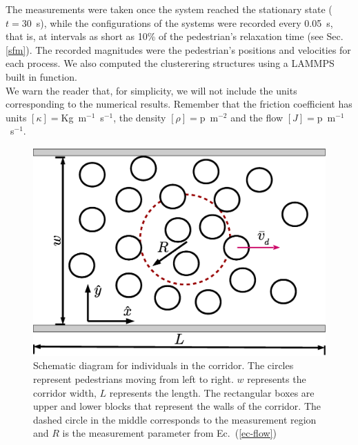The measurements were taken once the system reached the stationary state ($t=30$~s), while the configurations of the systems were recorded every 0.05~s, that is, at intervals as short as 10\% of the pedestrian’s relaxation time (see Sec. \ref{sfm}). The recorded magnitudes were the pedestrian’s positions and velocities for each process. We also computed the clusterering structures using a LAMMPS built in function.\\
  
We warn the reader that, for simplicity, we will not include the units corresponding to the numerical results. Remember that the friction coefficient has units $\left [ \kappa \right]=$Kg~m$^{-1}$~s$^{-1}$, the density $\left [ \rho \right]=$p~m$^{-2}$  and the flow  $\left [ J \right ]=$p~m$^{-1}$~s$^{-1}$.


\begin{figure}[htbp!]
\includegraphics[width=\columnwidth]
{./plots/corridor.eps}
\caption{\label{corridor} Schematic diagram for individuals in the corridor. 
The circles represent pedestrians moving from left to right. $w$ represents the corridor width, $L$ represents the length. The rectangular boxes are upper and lower blocks that represent the walls of the corridor. The dashed circle in the middle corresponds to the measurement region and $R$ is the measurement parameter from Ec.~(\ref{ec-flow})}
\end{figure}
